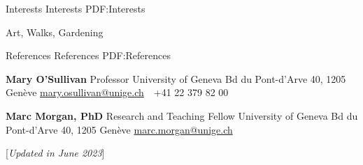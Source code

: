 \documentclass[letterpaper,MMMyyyy,nonstopmode]{simpleresumecv}
\newcommand{\CVNote}{Updated in June 2023}
\begin{document}
\begin{Body}
\Section
{Interests}
{Interests}
{PDF:Interests}

\Entry
Art, Walks, Gardening




\Section
{References}
{References}
{PDF:References}

\BulletItem
\textbf{Mary O'Sullivan}
\newline
Professor
\newline
University of Geneva
\newline
Bd du Pont-d'Arve 40, 1205 Genève
\newline
\href{mailto:mary.osullivan@unige.ch}
{mary.osullivan@unige.ch}
\,\SubBulletSymbol\,
+41 22 379 82 00

\BigGap
\BulletItem
\textbf{Marc Morgan, PhD}
\newline
Research and Teaching Fellow
\newline
University of Geneva
\newline
Bd du Pont-d'Arve 40, 1205 Genève
\newline
\href{marc.morgan@unige.ch}
{marc.morgan@unige.ch}

\end{Body}


\BigGap
\UseNoteFont%
\null\hfill%
[\textit{\CVNote}]
\end{document}
